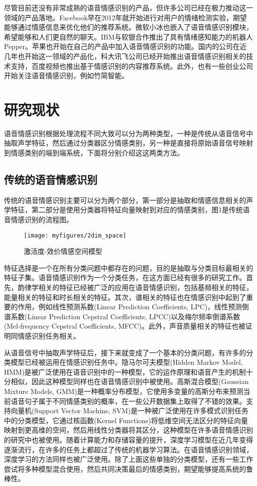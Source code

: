 尽管目前还没有非常成熟的语音情感识别的产品，但许多公司已经在极力推动这一领域的产品落地。Facebook早在2012年就开始进行对用户的情绪检测实验，期望能够通过情感信息来优化他们的推荐系统。微软小冰也嵌入了语音情感识别模块，希望能够和人们更自然的聊天。IBM与软银合作推出了具有情绪感知能力的机器人Pepper。苹果也开始在自己的产品中加入语音情感识别的功能。国内的公司在近几年也开始这一领域的产品化，科大讯飞公司已经开始推出语音情感识别相关的技术支持，百度视频也推出基于情感识别的内容推荐系统。此外，也有一些创业公司开始关注语音情感识别，例如竹简智能。

\section{研究现状}
\label{sec:status}
语音情感识别根据处理流程不同大致可以分为两种类型，一种是传统从语音信号中抽取声学特征，然后通过分类器区分情感类别，另一种是直接将原始语音信号映射到情感类别的端到端系统，下面将分别介绍这这两类方法。

\subsection{传统的语音情感识别}
\label{ssec:classical_emo_rec}
传统的语音情感识别主要可以分为两个部分，第一部分是抽取和情感信息相关的声学特征，第二部分是使用分类器将特征向量映射到对应的情感类别，图1是传统语音情感识别的流程图。

\begin{figure}[H] %
    \centering
    \texttt{[image: myfigures/2dim\_space]}
    \caption{激活度-效价情感空间模型}
    \label{fig:xfig1}
\end{figure}

特征选择是一个在所有分类问题中都存在的问题，目的是抽取与分类目标最相关的特征子集。语音情感识别作为一个分类任务，在这方面已经有很多的研究工作。首先，韵律学相关的特征已经被广泛的应用在语音情感识别，包括基频相关的特征，能量相关的特征和时长相关的特征。其次，谱相关的特征也在情感识别中起到了重要的作用，例如线性预测系数(Linear Prediction Coefficients, LPC)，线性预测倒谱系数(Linear Prediction Cepstral Coefficients, LPCC)以及梅尔频率倒谱系数(Mel-frequency Cepstral Coefficients, MFCC)。此外，声音质量相关的特征也被证明同情感识别任务相关。

从语音信号中抽取声学特征后，接下来就变成了一个基本的分类问题，有许多的分类模型已经被运用在情感识别任务中。隐马尔可夫模型(Hidden Markov Model, HMM)是被广泛使用在语音识别中的一种模型，它的运作原理和语音产生的机制十分相似，因此这种模型同样也在语音情感识别中被使用。高斯混合模型(Gaussian Mixture Models, GMM)是一种概率分布模型，它使用多变量的高斯分布来预测当前语音句子属于不同情感类别的概率，在一些公开数据集上取得了不错的效果。支持向量机(Support Vector Machine, SVM)是一种被广泛使用在许多模式识别任务中的分类模型，它通过核函数(Kernel Functions)将低维空间无法区分的特征向量映射到更高维的空间，然后用线性分类器将其区分，这种模型在许多语音情感识别的研究中也被使用。随着计算能力和存储容量的提升，深度学习模型在近几年变得逐渐流行，在许多的任务上都超过了传统的机器学习算法。在语音情感识别领域，深度学习的方法同样也被广泛使用。除了上面这些单独的分类模型，还有一些工作尝试将多种模型混合使用，然后共同决策最后的情感类别，期望能够提高系统的鲁棒性。

